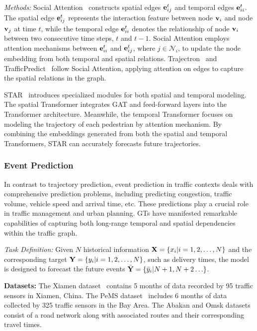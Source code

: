 \textit{Methods:}
Social Attention~\cite{vemula2018social} constructs spatial edges $\mathbf{e}_{ij}^{t}$ and temporal edges $\mathbf{e}_{ii}^{t}$. The spatial edge $\mathbf{e}_{ij}^{t}$ represents the interaction feature between node $\mathbf{v}_i$ and node $\mathbf{v}_j$ at time $t$, while the temporal edge $\mathbf{e}_{ii}^{t}$ denotes the relationship of node $\mathbf{v}_i$ between two consecutive time steps, $t$ and $t-1$. Social Attention employs attention mechanisms between $\mathbf{e}_{ii}^{t}$ and $\mathbf{e}_{ij}^{t}$, where $j \in \mathcal{N}_i$, to update the node embedding from both temporal and spatial relations.
Trajectron~\cite{ivanovic2019trajectron} and TrafficPredict~\cite{ma2019trafficpredict} follow Social Attention, applying attention on edges to capture the spatial relations in the graph.

STAR~\cite{yu2020spatio} introduces specialized modules for both spatial and temporal modeling. The spatial Transformer integrates GAT and feed-forward layers into the Transformer architecture. Meanwhile, the temporal Transformer focuses on modeling the trajectory of each pedestrian by attention mechanism.
By combining the embeddings generated from both the spatial and temporal Transformers, STAR can accurately forecasts future trajectories.


\subsubsection{\textbf{Event Prediction}}
In contrast to trajectory prediction, 
event prediction in traffic contexts deals with comprehensive prediction problems, including predicting congestion, traffic volume, vehicle speed and arrival time, etc. These predictions play a crucial role in traffic management and urban planning.
GTs have manifested remarkable capabilities of capturing both long-range temporal and spatial dependencies within the traffic graph.

\textit{Task Definition:}
Given $N$ historical information $\mathbf{X} = \{x_i|i=1, 2, \ldots, N\}$ and the corresponding target $\mathbf{Y} = \{y_i|i=1, 2, \ldots, N\}$, such as delivery times, the model is designed to forecast the future events $\Bar{\mathbf{Y}} = \{\Bar{y}_i|N+1, N+2 \ldots\}$.

\textbf{Datasets: } The Xiamen dataset~\cite{wang2017unlicensed} contains 5 months of data recorded by 95 traffic sensors in Xiamen, China. The PeMS dataset~\cite{li2018diffusion} includes 6 months of data collected by 325 traffic sensors in the Bay Area. The Abakan and Omsk datasets~\cite{porvatov2022hybrid} consist of a road network along with associated routes and their corresponding travel times.



